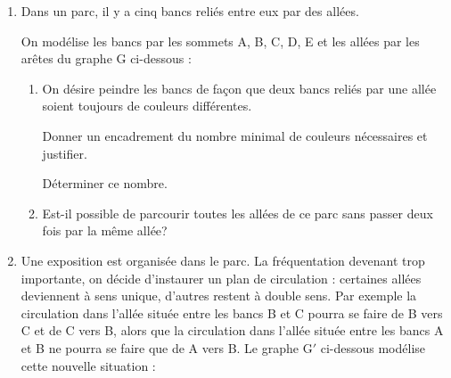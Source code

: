 \begin{enumerate}
\item  Dans un parc, il y a cinq bancs reliés entre eux par des allées.

On modélise les bancs par les sommets A, B, C, D, E et les allées par les arêtes du
graphe G ci-dessous :


\medskip
\begin{center}
\end{center}

\medskip

\begin{enumerate}
\item On désire peindre les bancs de façon que deux bancs reliés par une allée soient
toujours de couleurs différentes.

Donner un encadrement du nombre minimal de couleurs nécessaires et justifier.

Déterminer ce nombre.
\item Est-il possible de parcourir toutes les allées de ce parc sans passer deux fois par
la même allée?
\end{enumerate}
\item Une exposition est organisée dans le parc. La fréquentation devenant trop importante, on décide d'instaurer un plan de circulation : certaines allées deviennent à sens unique, d'autres restent à double sens. Par exemple la circulation dans l'allée
située entre les bancs B et C pourra se faire de B vers C et de C vers B, alors que la circulation dans l'allée située entre les bancs A et B ne pourra se faire que de A vers B. Le graphe G$'$ ci-dessous modélise cette nouvelle situation :


\end{enumerate}
